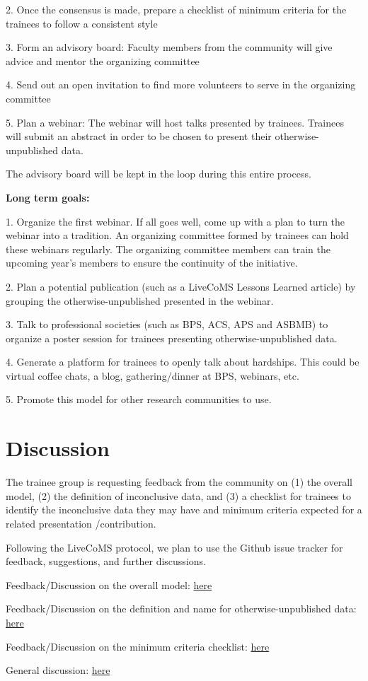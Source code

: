 \documentclass[9pt,lessons]{livecoms}
\theoremstyle{definition}
\theoremstyle{remark}
\begin{document}
2. Once the consensus is made, prepare a checklist of minimum criteria for the trainees to follow a consistent style

3. Form an advisory board: Faculty members from the community will give advice and mentor the organizing committee

4. Send out an open invitation to find more volunteers to serve in the organizing committee

5. Plan a webinar: The webinar will host talks presented by trainees. Trainees will submit an abstract in order to be chosen to present their otherwise-unpublished data. 

The advisory board will be kept in the loop during this entire process.

\textbf{Long term goals:}

1. Organize the first webinar. If all goes well, come up with a plan to turn the webinar into a tradition. An organizing committee formed by trainees can hold these 
webinars regularly. The organizing committee members can train the upcoming year’s members to ensure the continuity of the initiative.

2. Plan a potential publication (such as a LiveCoMS Lessons Learned article) by grouping the otherwise-unpublished presented in the webinar.

3. Talk to professional societies (such as BPS, ACS, APS and ASBMB) to organize a poster session for trainees presenting otherwise-unpublished data.

4. Generate a platform for trainees to openly talk about hardships. This could be virtual coffee chats, a blog, gathering/dinner at BPS, webinars, etc.  

5. Promote this model for other research communities to use.


\section{Discussion}

The trainee group is requesting feedback from the community on (1) the overall model, (2) the definition of inconclusive data, and (3) a checklist for trainees to 
identify the inconclusive data they may have and minimum criteria expected for a related presentation /contribution.

Following the LiveCoMS protocol, we plan to use the Github issue tracker for feedback, suggestions, and further discussions.

Feedback/Discussion on the overall model: \href{https://github.com/Poruthoor/NegativeDataInitiative/issues/2}{here}

Feedback/Discussion on the definition and name for otherwise-unpublished data: \href{https://github.com/Poruthoor/NegativeDataInitiative/issues/3}{here} 

Feedback/Discussion on the minimum criteria checklist: \href{https://github.com/Poruthoor/NegativeDataInitiative/issues/4}{here} 

General discussion: \href{https://github.com/Poruthoor/NegativeDataInitiative/discussions/6}{here} 
\end{document}
